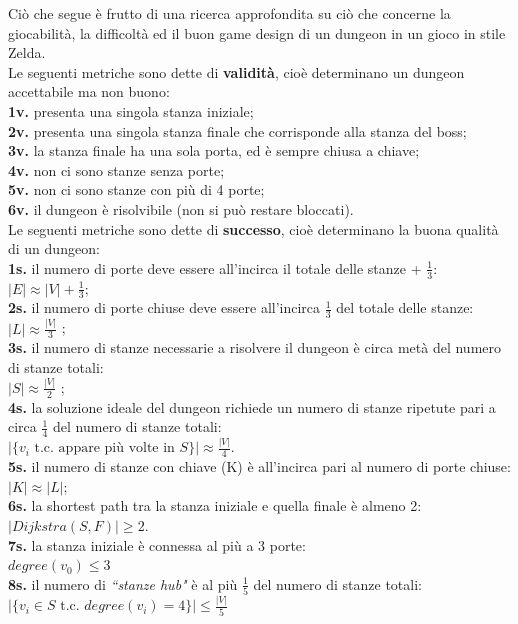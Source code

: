 \documentclass[12pt,titlepage]{article}
\begin{document}
Ciò che segue è frutto di una ricerca approfondita su ciò che concerne la giocabilità, la difficoltà ed il buon game design di un dungeon in un gioco in stile Zelda.\cite{metazelda}\cite{hacker}\\

\noindent Le seguenti metriche sono dette di \textbf{validità}, cioè determinano un dungeon accettabile ma non buono:\\
\textbf{1v.} presenta una singola stanza iniziale;\\
\textbf{2v.} presenta una singola stanza finale che corrisponde alla stanza del boss;\\
\textbf{3v.} la stanza finale ha una sola porta, ed è sempre chiusa a chiave;\\
\textbf{4v.} non ci sono stanze senza porte;\\
\textbf{5v.} non ci sono stanze con più di 4 porte;\\
\textbf{6v.} il dungeon è risolvibile (non si può restare bloccati).\\

\noindent Le seguenti metriche sono dette di \textbf{successo}, cioè determinano la buona qualità di un dungeon:\\
\textbf{1s.} il numero di porte deve essere all'incirca il totale delle stanze + $\frac{1}{3}$:\\
$|E| \approx |V| + \frac{1}{3}$;\\
\textbf{2s.} il numero di porte chiuse deve essere all'incirca $\frac{1}{3}$ del totale delle stanze:\\
$|L| \approx \frac{|V|}{3}$
;\\
\textbf{3s.} il numero di stanze necessarie a risolvere il dungeon è circa metà del numero di stanze totali:\\
$|S| \approx \frac{|V|}{2}$
;\\
\textbf{4s.} la soluzione ideale del dungeon richiede un numero di stanze ripetute pari a circa $\frac{1}{4}$ del numero di stanze totali:\\
$|\{v_i \text{ t.c. appare più volte in } S\}| \approx \frac{|V|}{4}$.\\
\textbf{5s.} il numero di stanze con chiave (K) è all'incirca pari al numero di porte chiuse:\\
$|K| \approx |L|$;\\
\textbf{6s.} la shortest path tra la stanza iniziale e quella finale è almeno 2:\\
$|Dijkstra(S, F)| \geq 2$.\\
\textbf{7s.} la stanza iniziale è connessa al più a 3 porte:\\
$degree(v_0) \leq 3$\\
\textbf{8s.} il numero di \textit{``stanze hub"} è al più $\frac{1}{5}$ del numero di stanze totali:\\
$|\{v_i \in S \text{ t.c. } degree(v_i) = 4\}| \leq \frac{|V|}{5}$\\
\end{document}
